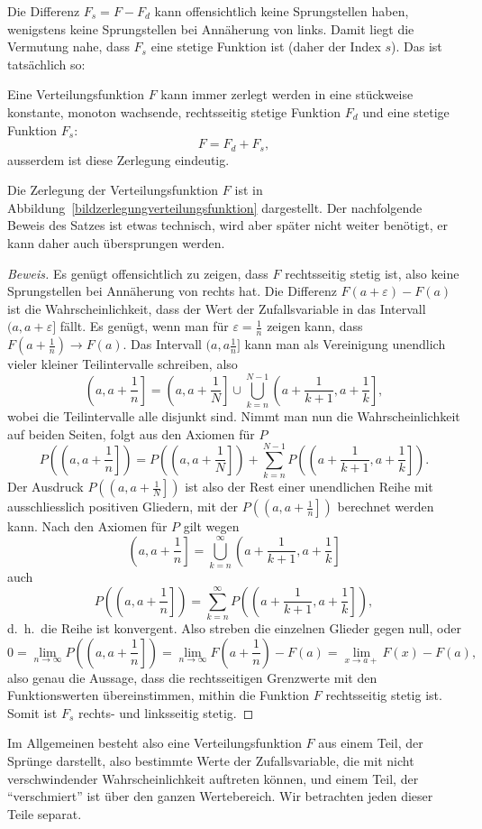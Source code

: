 Die Differenz $F_s=F-F_d$ kann offensichtlich keine Sprungstellen haben,
wenigstens keine Sprungstellen bei Annäherung von links.
Damit liegt
die Vermutung nahe, dass $F_s$ eine stetige Funktion ist (daher der Index
$s$).
Das ist tatsächlich so:
\begin{satz}Eine Verteilungsfunktion $F$ kann immer zerlegt werden in eine
stückweise konstante, monoton wachsende, rechtsseitig stetige Funktion
$F_d$ und eine stetige Funktion $F_s$:
\[
F=F_d+F_s,
\]
ausserdem ist diese Zerlegung eindeutig.
\end{satz}
Die Zerlegung der Verteilungsfunktion $F$ ist in
Abbildung~\ref{bildzerlegungverteilungsfunktion} dargestellt.
Der nachfolgende Beweis des Satzes ist etwas technisch, wird aber später nicht
weiter benötigt, er kann daher auch übersprungen werden.
{\small
\begin{proof}[Beweis]
Es genügt offensichtlich zu zeigen, dass $F$ rechtsseitig stetig ist, also
keine Sprungstellen bei Annäherung von rechts hat.
Die Differenz
$F(a+\varepsilon)-F(a)$ ist die Wahrscheinlichkeit, dass der Wert der
Zufallsvariable in das Intervall $(a,a+\varepsilon]$
fällt.
Es genügt, wenn man für $\varepsilon=\frac1n$ zeigen kann,
dass $F(a+\frac1n)\to F(a)$.
Das Intervall $(a,a\frac1n]$ kann man
als Vereinigung unendlich vieler kleiner Teilintervalle
schreiben, also
\[
\left(a,{\textstyle a+\frac1n}\right]
= \left(a,a+{\textstyle \frac1N}\right]\cup
\bigcup_{k=n}^{N-1}\left(a+{\textstyle\frac1{k+1}},a+{\textstyle\frac1k}\right],
\]
wobei die Teilintervalle alle disjunkt sind.
Nimmt man nun die Wahrscheinlichkeit auf beiden Seiten, folgt aus den
Axiomen für $P$
\[
P\left(\left(a,a+{\textstyle\frac1n}\right]\right)
=
P\left(\left(a,a+{\textstyle \frac1N}\right]\right)+
\sum_{k=n}^{N-1}P\left(\left(a+{\textstyle\frac1{k+1}},a+{\textstyle\frac1k}\right]\right).
\]
Der Ausdruck $P\left(\left(a,a+{\frac1N}\right]\right)$ ist also der
Rest einer unendlichen Reihe mit ausschliesslich positiven Gliedern,
mit der $P\left(\left(a,a+{\textstyle\frac1n}\right]\right)$
berechnet werden kann.
 Nach den Axiomen für $P$ gilt wegen
\[
\left(a,{\textstyle a+\frac1n}\right]
= 
\bigcup_{k=n}^{\infty}
\left(a+{\textstyle\frac1{k+1}},a+{\textstyle\frac1k}\right]
\]
auch
\[
P\left(\left(a,{\textstyle a+\frac1n}\right]\right)
= 
\sum_{k=n}^{\infty}
P\left(\left(a+{\textstyle\frac1{k+1}},a+{\textstyle\frac1k}\right]\right),
\]
d.~h.~die Reihe ist konvergent.
Also streben die einzelnen Glieder gegen null,
oder
\[
0=\lim_{n\to\infty}P\left(\left(a,{\textstyle a+\frac1n}\right]\right)
=\lim_{n\to\infty}F(a+{\textstyle\frac1n}) - F(a)=\lim_{x\to a+} F(x)-F(a),
\]
also genau die Aussage, dass die rechtsseitigen Grenzwerte mit den
Funktionswerten übereinstimmen, mithin die Funktion $F$ rechtsseitig
stetig ist.
Somit ist $F_s$ rechts- und linksseitig stetig.
\end{proof}
}
Im Allgemeinen besteht also eine Verteilungsfunktion $F$ aus einem
Teil, der Sprünge darstellt, also bestimmte Werte der Zufallsvariable,
die mit nicht verschwindender Wahrscheinlichkeit auftreten können, und
einem Teil, der ``verschmiert'' ist über den ganzen Wertebereich.
Wir
betrachten jeden dieser Teile separat.

